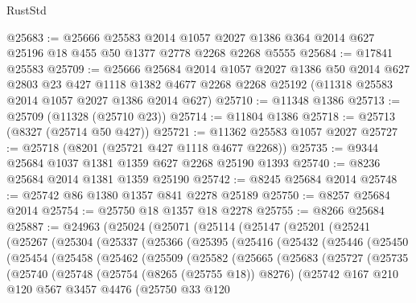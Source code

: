 \begin{lexlean}{RustStd}
\begin{coremodule}
@25683 := @25666
    @25583
    @2014
    @1057
    @2027
    @1386
    @364
    @2014
    @627
    @25196
    @18
    @455
    @50
    @1377
    @2778
    @2268
    @2268
    @5555
@25684 := @17841 @25583
@25709 := @25666
    @25684
    @2014
    @1057
    @2027
    @1386
    @50
    @2014
    @627
    @2803
    @23
    @427
    @1118
    @1382
    @4677
    @2268
    @2268
    @25192
    (@11318 @25583 @2014 @1057 @2027 @1386 @2014 @627)
@25710 := @11348 @1386
@25713 := @25709 (@11328 (@25710 @23))
@25714 := @11804 @1386
@25718 := @25713 (@8327 (@25714 @50 @427))
@25721 := @11362 @25583 @1057 @2027
@25727 := @25718 (@8201 (@25721 @427 @1118 @4677 @2268))
@25735 := @9344 @25684 @1037 @1381 @1359 @627 @2268 @25190 @1393
@25740 := @8236 @25684 @2014 @1381 @1359 @25190
@25742 := @8245 @25684 @2014
@25748 := @25742 @86 @1380 @1357 @841 @2278 @25189
@25750 := @8257 @25684 @2014
@25754 := @25750 @18 @1357 @18 @2278
@25755 := @8266 @25684
@25887 := @24963
    (@25024
      (@25071
        (@25114
          (@25147
            (@25201
              (@25241
                (@25267
                  (@25304
                    (@25337
                      (@25366
                        (@25395
                          (@25416
                            (@25432
                              (@25446
                                (@25450
                                  (@25454
                                    (@25458
                                      (@25462
                                        (@25509
                                          (@25582
                                            (@25665
                                              (@25683
                                                (@25727
                                                  (@25735
                                                    (@25740
                                                      (@25748
                                                        (@25754 (@8265 (@25755 @18)) @8276)
                                                        (@25742
                                                          @167
                                                          @210
                                                          @120
                                                          @567
                                                          @3457
                                                          @4476
                                                          (@25750
                                                            @33
                                                            @120

\end{coremodule}
\end{lexlean}
